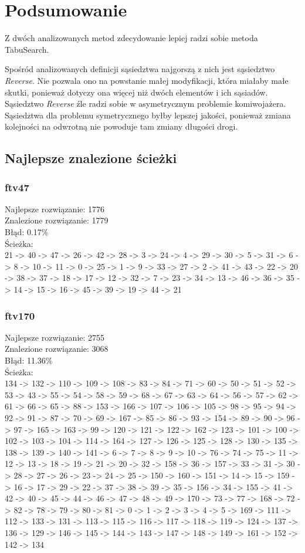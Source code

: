 \documentclass[12pt]{article}
\begin{document}
\clearpage
\section{Podsumowanie}
Z dwóch analizowanych metod zdecydowanie lepiej radzi sobie metoda TabuSearch.

Spośród analizowanych definicji sąsiedztwa najgorszą z nich jest sąsiedztwo \textit{Reverse}. Nie pozwala ono na powstanie małej modyfikacji, która miałaby małe skutki, ponieważ dotyczy ona więcej niż dwóch elementów i ich sąsiadów.
Sąsiedztwo \textit{Reverse} źle radzi sobie w asymetrycznym problemie komiwojażera. Sąsiedztwa dla problemu symetrycznego byłby lepszej jakości, ponieważ zmiana kolejności na odwrotną nie powoduje tam zmiany długości drogi.

\subsection{Najlepsze znalezione ścieżki}

\subsubsection{ftv47}
Najlepsze rozwiązanie: 1776\\
Znalezione rozwiązanie: 1779\\
Błąd: 0.17\%\\
Ścieżka:\\
\tiny
21 -> 40 -> 47 -> 26 -> 42 -> 28 -> 3 -> 24 -> 4 -> 29 -> 30 -> 5 -> 31 -> 6 -> 8 -> 10 -> 11 -> 0 -> 25 -> 1 -> 9 -> 33 -> 27 -> 2 -> 41 -> 43 -> 22 -> 20 -> 38 -> 37 -> 18 -> 17 -> 12 -> 32 -> 7 -> 23 -> 34 -> 13 -> 46 -> 36 -> 35 -> 14 -> 15 -> 16 -> 45 -> 39 -> 19 -> 44 -> 21
\normalsize
\subsubsection{ftv170}
Najlepsze rozwiązanie: 2755\\
Znalezione rozwiązanie: 3068\\
Błąd: 11.36\%\\
Ścieżka:\\
\tiny
    134 -> 132 -> 110 -> 109 -> 108 -> 83 -> 84 -> 71 -> 60 -> 50 -> 51 -> 52 -> 53 -> 43 -> 55 -> 54 -> 58 -> 59 -> 68 -> 67 -> 63 -> 64 -> 56 -> 57 -> 62 -> 61 -> 66 -> 65 -> 88 -> 153 -> 166 -> 107 -> 106 -> 105 -> 98 -> 95 -> 94 -> 92 -> 91 -> 87 -> 70 -> 69 -> 167 -> 85 -> 86 -> 93 -> 154 -> 89 -> 90 -> 96 -> 97 -> 165 -> 163 -> 99 -> 120 -> 121 -> 122 -> 162 -> 123 -> 101 -> 100 -> 102 -> 103 -> 104 -> 114 -> 164 -> 127 -> 126 -> 125 -> 128 -> 130 -> 135 -> 138 -> 139 -> 140 -> 141 -> 6 -> 7 -> 8 -> 9 -> 10 -> 76 -> 74 -> 75 -> 11 -> 12 -> 13 -> 18 -> 19 -> 21 -> 20 -> 32 -> 158 -> 36 -> 157 -> 33 -> 31 -> 30 -> 28 -> 27 -> 26 -> 23 -> 24 -> 25 -> 150 -> 160 -> 151 -> 14 -> 15 -> 159 -> 16 -> 17 -> 29 -> 22 -> 37 -> 38 -> 39 -> 35 -> 156 -> 34 -> 155 -> 41 -> 42 -> 40 -> 45 -> 44 -> 46 -> 47 -> 48 -> 49 -> 170 -> 73 -> 77 -> 168 -> 72 -> 82 -> 78 -> 79 -> 80 -> 81 -> 0 -> 1 -> 2 -> 3 -> 4 -> 5 -> 169 -> 111 -> 112 -> 133 -> 131 -> 113 -> 115 -> 116 -> 117 -> 118 -> 119 -> 124 -> 137 -> 136 -> 129 -> 146 -> 145 -> 144 -> 143 -> 147 -> 148 -> 149 -> 161 -> 152 -> 142 -> 134
\normalsize
\end{document}
